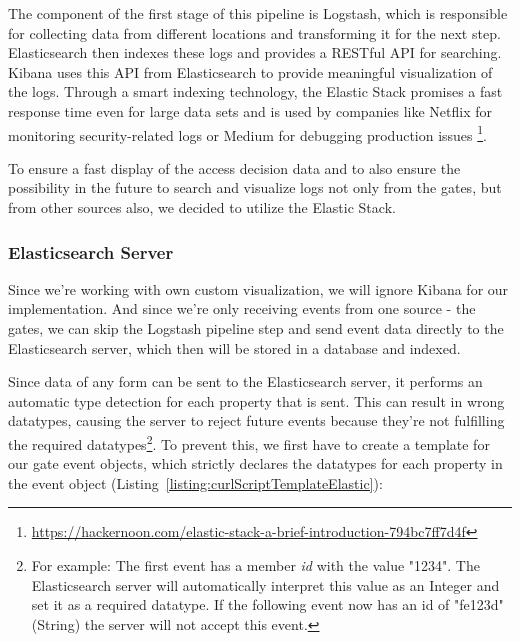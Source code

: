 The component of the first stage of this pipeline is Logstash, which is responsible for collecting data from different locations and transforming it for the next step. Elasticsearch then indexes these logs and provides a RESTful API for searching. Kibana uses this API from Elasticsearch to provide meaningful visualization of the logs.
Through a smart indexing technology, the Elastic Stack promises a fast response time even for large data sets and is used by companies like Netflix for monitoring security-related logs or Medium for debugging production issues \footnote{\url{https://hackernoon.com/elastic-stack-a-brief-introduction-794bc7ff7d4f}}.

To ensure a fast display of the access decision data and to also ensure the possibility in the future to search and visualize logs not only from the gates, but from other sources also, we decided to utilize the Elastic Stack.

\subsubsection{Elasticsearch Server}

Since we're working with own custom visualization, we will ignore Kibana for our implementation. And since we're only receiving events from one source - the gates, we can skip the Logstash pipeline step and send event data directly to the Elasticsearch server, which then will be stored in a database and indexed.

Since data of any form can be sent to the Elasticsearch server, it performs an automatic type detection for each property that is sent. This can result in wrong datatypes, causing the server to reject future events because they're not fulfilling the required datatypes\footnote{For example: The first event has a member \emph{id} with the value "1234". The Elasticsearch server will automatically interpret this value as an Integer and set it as a required datatype. If the following event now has an id of "fe123d" (String) the server will not accept this event.}. To prevent this, we first have to create a template for our gate event objects, which strictly declares the datatypes for each property in the event object (Listing~\ref{listing:curlScriptTemplateElastic}):

